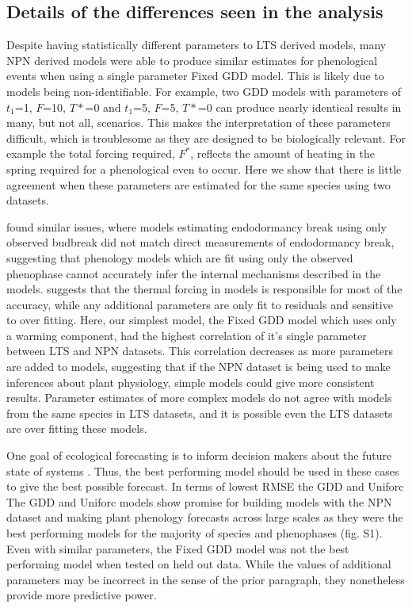 \documentclass[fleqn,10pt,lineno]{wlpeerj} %
\begin{document}
\subsection{Details of the differences seen in the analysis}

Despite having statistically different parameters to LTS derived models, many NPN derived models were able to produce similar estimates for phenological events when using a single parameter Fixed GDD model. This is likely due to models being non-identifiable. For example, two GDD models with parameters of $t_{1}$=1, $F$=10, $T*$=0 and $t_{1}$=5, $F$=5, $T*$=0 can produce nearly identical results in many, but not all, scenarios. This makes the interpretation of these parameters difficult, which is troublesome as they are designed to be biologically relevant. For example the total forcing required, $F^*$, reflects the amount of heating in the spring required for a phenological even to occur. Here we show that there is little agreement when these parameters are estimated for the same species using two datasets. 

\cite{chuine2016} found similar issues, where models estimating endodormancy break using only observed budbreak did not match direct measurements of endodormancy break, suggesting that phenology models which are fit using only the observed phenophase cannot accurately infer the internal mechanisms described in the models. \cite{basler2016} suggests that the thermal forcing in models is responsible for most of the accuracy, while any additional parameters are only fit to residuals and sensitive to over fitting. Here, our simplest model, the Fixed GDD model which uses only a warming component, had the highest correlation of it's single parameter between LTS and NPN datasets. This correlation decreases as more parameters are added to models, suggesting that if the NPN dataset is being used to make inferences about plant physiology, simple models could give more consistent results. Parameter estimates of more complex models do not agree with models from the same species in LTS datasets, and it is possible even the LTS datasets are over fitting these models. 

One goal of ecological forecasting is to inform decision makers about the future state of systems \citep{dietz2018}. Thus, the best performing model should be used in these cases to give the best possible forecast. In terms of lowest RMSE the GDD and Uniforc The GDD and Uniforc models show promise for building models with the NPN dataset and making plant phenology forecasts across large scales as they were the best performing models for the majority of species and phenophases (fig. S1). Even with similar parameters, the Fixed GDD model was not the best performing model when tested on held out data. While the values of additional parameters may be incorrect in the sense of the prior paragraph, they nonetheless provide more predictive power. 
\end{document}
